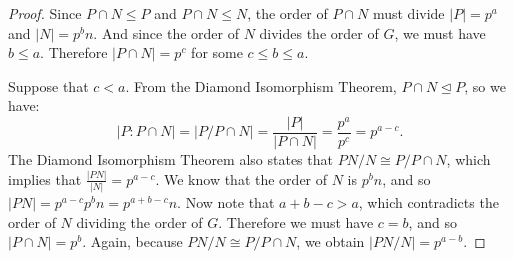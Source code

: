 \documentclass{article}
\begin{document}
\begin{proof}
    Since $P \cap N \leq P$ and $P \cap N \leq N$, the order of $P \cap N$ must divide $|P| = p^a$ and $|N| = p^b n$. And since the order of $N$ divides the order of $G$, we must have $b \leq a$. Therefore $|P \cap N| = p^c$ for some $c \leq b \leq a$.

    Suppose that $c < a$. From the Diamond Isomorphism Theorem, $P \cap N \unlhd P$, so we have:
    \begin{equation*}
        |P : P \cap N| = |P / P \cap N| = \frac{|P|}{|P \cap N|} = \frac{p^a}{p^c} = p^{a - c}.
    \end{equation*}
    The Diamond Isomorphism Theorem also states that $PN / N \cong P / P \cap N$, which implies that $\frac{|PN|}{|N|} = p^{a - c}$. We know that the order of $N$ is $p^b n$, and so $|PN| = p^{a - c} p^b n = p^{a + b - c} n$. Now note that $a + b - c > a$, which contradicts the order of $N$ dividing the order of $G$. Therefore we must have $c = b$, and so $|P \cap N| = p^b$. Again, because $PN / N \cong P / P \cap N$, we obtain $|PN / N| = p^{a - b}$.
\end{proof}
\end{document}
